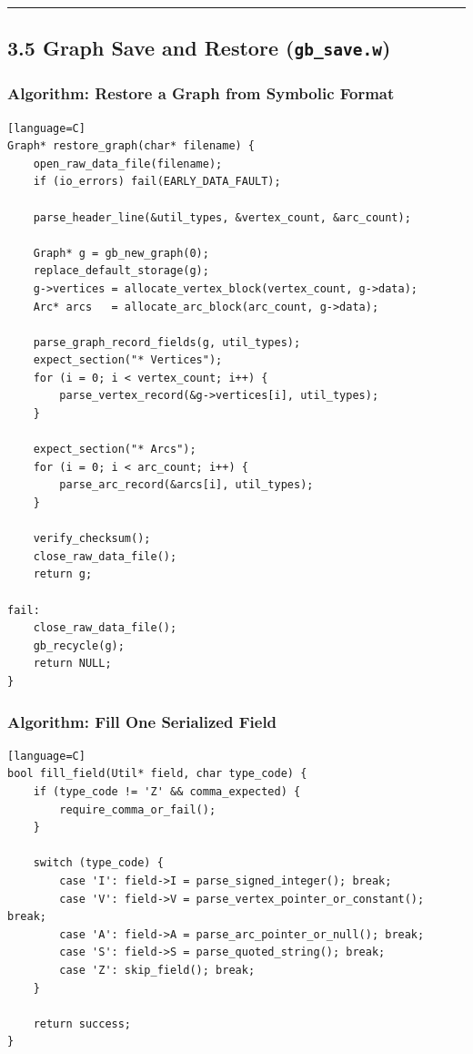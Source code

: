 \documentclass[11pt]{article}
\begin{document}
\begin{center}\rule{0.5\linewidth}{0.5pt}\end{center}

\subsection{\texorpdfstring{3.5 Graph Save and Restore (\texttt{gb\_save.w})}{3.5 Graph Save and Restore (gb\_save.w)}}\label{graph-save-and-restore-gb_save.w}

\subsubsection{Algorithm: Restore a Graph from Symbolic Format}\label{algorithm-restore-a-graph-from-symbolic-format}

\begin{verbatim}[language=C]
Graph* restore_graph(char* filename) {
    open_raw_data_file(filename);
    if (io_errors) fail(EARLY_DATA_FAULT);

    parse_header_line(&util_types, &vertex_count, &arc_count);

    Graph* g = gb_new_graph(0);
    replace_default_storage(g);
    g->vertices = allocate_vertex_block(vertex_count, g->data);
    Arc* arcs   = allocate_arc_block(arc_count, g->data);

    parse_graph_record_fields(g, util_types);
    expect_section("* Vertices");
    for (i = 0; i < vertex_count; i++) {
        parse_vertex_record(&g->vertices[i], util_types);
    }

    expect_section("* Arcs");
    for (i = 0; i < arc_count; i++) {
        parse_arc_record(&arcs[i], util_types);
    }

    verify_checksum();
    close_raw_data_file();
    return g;

fail:
    close_raw_data_file();
    gb_recycle(g);
    return NULL;
}
\end{verbatim}

\subsubsection{Algorithm: Fill One Serialized Field}\label{algorithm-fill-one-serialized-field}

\begin{verbatim}[language=C]
bool fill_field(Util* field, char type_code) {
    if (type_code != 'Z' && comma_expected) {
        require_comma_or_fail();
    }

    switch (type_code) {
        case 'I': field->I = parse_signed_integer(); break;
        case 'V': field->V = parse_vertex_pointer_or_constant(); break;
        case 'A': field->A = parse_arc_pointer_or_null(); break;
        case 'S': field->S = parse_quoted_string(); break;
        case 'Z': skip_field(); break;
    }

    return success;
}
\end{verbatim}
\end{document}
